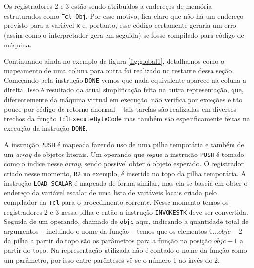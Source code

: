Os registradores 2 e 3 estão sendo atribuídos a endereços de memória
estruturados como \verb!Tcl_Obj!. Por esse motivo, fica claro que não
há um endereço previsto para a variável \verb!x! e, portanto, esse
código certamente geraria um erro (assim como o interpretador gera em
seguida) se fosse compilado para código de máquina.%



Continuando ainda no exemplo da figura \ref{fig:global1}, detalhamos
como o mapeamento de uma coluna para outra foi realizado no restante
dessa seção. Começando
pela instrução \verb!DONE! vemos que
nada equivalente aparece na coluna a direita. Isso é resultado da
atual simplificação feita na outra representação, que, diferentemente
da máquina virtual em execução, não verifica por exceções e tão pouco
por código de retorno anormal -- tais tarefas são realizadas em
diversos trechos da função \verb!TclExecuteByteCode! mas também são
especificamente feitas na execução da instrução \verb!DONE!.

A instrução \verb!PUSH! é mapeada fazendo uso de uma pilha temporária e
também de um \textit{array} de objetos literais. Um operando que segue a
instrução \verb!PUSH! é tomado como o índice nesse \textit{array}, sendo
possível obter o objeto esperado. O registrador criado nesse momento,
\verb!R2! no exemplo, é
inserido no topo da pilha temporária. A instrução \verb!LOAD_SCALAR!
é mapeada de forma similar, mas ela se baseia em obter o
endereço da variável escalar de uma lista de variáveis locais
criada pelo compilador da \texttt{Tcl} para o procedimento
corrente. Nesse momento temos os registradores 2 e 3 nessa pilha e
então a instrução \verb!INVOKESTK! deve ser convertida. Seguida de um
operando, chamado de \verb!objc! aqui, indicando a quantidade total de
argumentos -- incluindo o nome da função -- temos que os elementos
$0 \dots objc - 2$ da pilha a partir do topo são os parâmetros para
a função na posição $objc - 1$ a partir do topo. Na representação
utilizada não é contado o nome da função como um parâmetro, por isso
entre parênteses vê-se o número 1 ao invés do 2.


